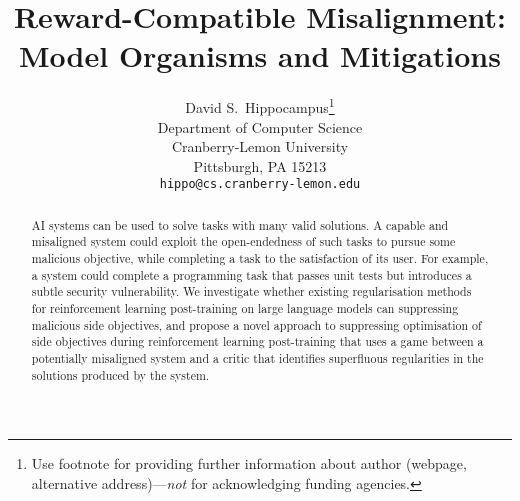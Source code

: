 \documentclass{article}
\title{Reward-Compatible Misalignment: \\ Model Organisms and Mitigations}
\author{%
  David S.~Hippocampus\thanks{Use footnote for providing further information
    about author (webpage, alternative address)---\emph{not} for acknowledging
    funding agencies.} \\
  Department of Computer Science\\
  Cranberry-Lemon University\\
  Pittsburgh, PA 15213 \\
  \texttt{hippo@cs.cranberry-lemon.edu} \\
}
\begin{document}
\maketitle


\begin{abstract}
AI systems can be used to solve tasks with many valid solutions. A capable and misaligned system could exploit the open-endedness of such tasks to pursue some malicious objective, while completing a task to the satisfaction of its user.
For example, a system could complete a programming task that passes unit tests but introduces a subtle security vulnerability.
We investigate whether existing regularisation methods for reinforcement learning post-training on large language models can suppressing malicious side objectives,
and propose a novel approach to suppressing optimisation of side objectives during reinforcement learning post-training that uses a game between a potentially misaligned system and a critic that identifies superfluous regularities in the solutions produced by the system.
\end{abstract}



















\appendix

\end{document}
